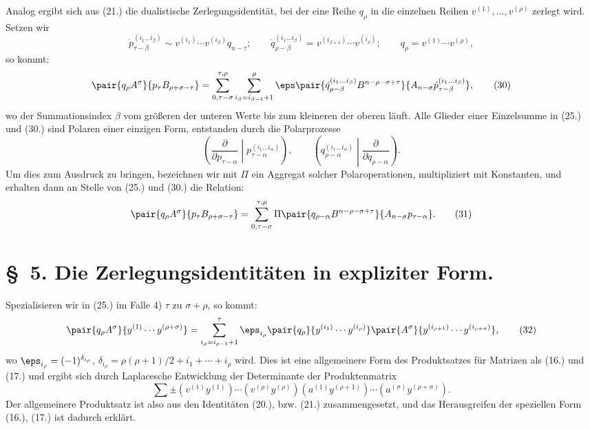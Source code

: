 Analog ergibt sich aus (21.) die dualistische Zerlegungsidentit\"at, bei der eine Reihe $q_\rho$ in die einzelnen Reihen $v^{(1)},\ldots,v^{(\rho)}$ zerlegt wird. Setzen wir
\begin{equation}
 \dot p_{\tau-\beta}^{(i_1\ldots i_\beta)}\sim v^{(i_1)}\cdots v^{(i_\beta)}q_{n-\tau};\qquad
 \dot q_{\rho-\beta}^{(i_1\ldots i_\beta)}=v^{(i_{\beta+1})}\cdots v^{(i_\rho)};\qquad
 q_\rho=v^{(1)}\cdots v^{(\rho)},
\tag{29}
\end{equation}
so kommt:
\begin{equation}
 \pair{q_\rho A^\sigma}{p_\tau B_{\rho+\sigma-\tau}}
 =\sum_{\substack{0,\tau-\sigma}}^{\substack{\tau,\rho}}
   \sum_{i_\beta=i_{\beta-1}+1}^{\rho}\eps
\pair{\dot q_{\rho-\beta}^{(i_1\ldots i_\beta)}B^{n-\rho-\sigma+\tau}}{A_{n-\sigma}\dot p_{\tau-\beta}^{(i_1\ldots i_\beta)}} ,
\tag{30}
\end{equation}
wo der Summationsindex $\beta$ vom gr\"o\ss eren der unteren Werte bis zum kleineren der oberen l\"auft. Alle Glieder einer Einzelsumme in (25.) und (30.) sind Polaren einer einzigen Form, entstanden durch die Polarprozesse
\[
\left(\frac{\partial}{\partial p_{\tau-\alpha}}\middle|p_{\tau-\alpha}^{(i_1\ldots i_\alpha)}\right),\qquad
\left(q_{\rho-\alpha}^{(i_1\ldots i_\alpha)}\middle|\frac{\partial}{\partial q_{\rho-\alpha}}\right).
\]
Um dies zum Ausdruck zu bringen, bezeichnen wir mit $\Pi$ ein Aggregat solcher Polaroperationen, multipliziert mit Konstanten, und erhalten dann an Stelle von (25.) und (30.) die Relation:
\begin{equation}
 \pair{q_\rho A^\sigma}{p_\tau B_{\rho+\sigma-\tau}}
 =\sum_{\substack{0,\tau-\sigma}}^{\substack{\tau,\rho}}
 \Pi\pair{q_{\rho-\alpha}B^{n-\rho-\sigma+\tau}}{A_{n-\sigma}p_{\tau-\alpha}}.
\tag{31}
\end{equation}

\section*{\S\ 5. Die Zerlegungsidentit\"aten in expliziter Form.}
Spezialisieren wir in (25.) im Falle 4) $\tau$ zu $\sigma+\rho$, so kommt:
\begin{equation}
 \pair{q_\rho A^\sigma}{y^{(1)}\cdots y^{(\rho+\sigma)}}
 =\sum_{i_\rho=i_{\rho-1}+1}^{\tau}
 \eps_{i_\rho}\pair{q_\rho}{y^{(i_1)}\cdots y^{(i_\rho)}}
 \pair{A^\sigma}{y^{(i_{\rho+1})}\cdots y^{(i_{\rho+\sigma})}},
\tag{32}
\end{equation}
wo $\eps_{i_\rho}=(-1)^{\delta_{i_\rho}}$, $\delta_{i_\rho}=\rho(\rho+1)/2+i_1+\cdots+i_\rho$ wird. Dies ist eine allgemeinere Form des Produktsatzes f\"ur Matrizen als (16.) und (17.) und ergibt sich durch Laplacesche Entwicklung der Determinante der Produktenmatrix
\[
 \sum\pm(v^{(1)}y^{(1)})\cdots(v^{(\rho)}y^{(\rho)})(a^{(1)}y^{(\rho+1)})\cdots(a^{(\sigma)}y^{(\rho+\sigma)}).
\]
Der allgemeinere Produktsatz ist also aus den Identit\"aten (20.), bzw. (21.) zusammengesetzt, und das Herausgreifen der speziellen Form (16.), (17.) ist dadurch erkl\"art.


